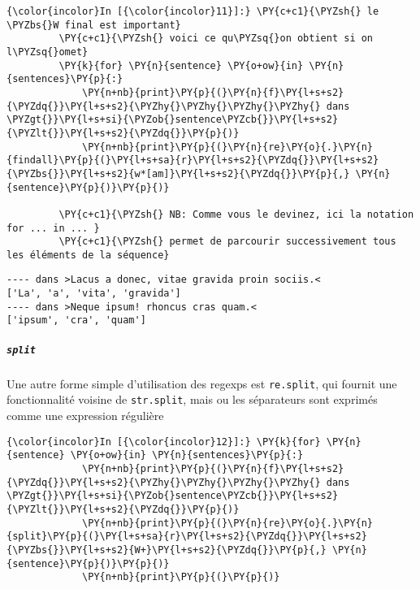     \begin{Verbatim}[commandchars=\\\{\},frame=single,framerule=0.3mm,rulecolor=\color{cellframecolor}]
{\color{incolor}In [{\color{incolor}11}]:} \PY{c+c1}{\PYZsh{} le \PYZbs{}W final est important}
         \PY{c+c1}{\PYZsh{} voici ce qu\PYZsq{}on obtient si on l\PYZsq{}omet}
         \PY{k}{for} \PY{n}{sentence} \PY{o+ow}{in} \PY{n}{sentences}\PY{p}{:}
             \PY{n+nb}{print}\PY{p}{(}\PY{n}{f}\PY{l+s+s2}{\PYZdq{}}\PY{l+s+s2}{\PYZhy{}\PYZhy{}\PYZhy{}\PYZhy{} dans \PYZgt{}}\PY{l+s+si}{\PYZob{}sentence\PYZcb{}}\PY{l+s+s2}{\PYZlt{}}\PY{l+s+s2}{\PYZdq{}}\PY{p}{)}
             \PY{n+nb}{print}\PY{p}{(}\PY{n}{re}\PY{o}{.}\PY{n}{findall}\PY{p}{(}\PY{l+s+sa}{r}\PY{l+s+s2}{\PYZdq{}}\PY{l+s+s2}{\PYZbs{}}\PY{l+s+s2}{w*[am]}\PY{l+s+s2}{\PYZdq{}}\PY{p}{,} \PY{n}{sentence}\PY{p}{)}\PY{p}{)}
             
         \PY{c+c1}{\PYZsh{} NB: Comme vous le devinez, ici la notation for ... in ... }
         \PY{c+c1}{\PYZsh{} permet de parcourir successivement tous les éléments de la séquence}
\end{Verbatim}


    \begin{Verbatim}[commandchars=\\\{\},frame=single,framerule=0.3mm,rulecolor=\color{cellframecolor}]
---- dans >Lacus a donec, vitae gravida proin sociis.<
['La', 'a', 'vita', 'gravida']
---- dans >Neque ipsum! rhoncus cras quam.<
['ipsum', 'cra', 'quam']
\end{Verbatim}

    \hypertarget{split}{%
\subparagraph{\texorpdfstring{\texttt{split}}{split}}\label{split}}

    Une autre forme simple d'utilisation des regexps est \texttt{re.split},
qui fournit une fonctionnalité voisine de \texttt{str.split}, mais ou
les séparateurs sont exprimés comme une expression régulière

    \begin{Verbatim}[commandchars=\\\{\},frame=single,framerule=0.3mm,rulecolor=\color{cellframecolor}]
{\color{incolor}In [{\color{incolor}12}]:} \PY{k}{for} \PY{n}{sentence} \PY{o+ow}{in} \PY{n}{sentences}\PY{p}{:}
             \PY{n+nb}{print}\PY{p}{(}\PY{n}{f}\PY{l+s+s2}{\PYZdq{}}\PY{l+s+s2}{\PYZhy{}\PYZhy{}\PYZhy{}\PYZhy{} dans \PYZgt{}}\PY{l+s+si}{\PYZob{}sentence\PYZcb{}}\PY{l+s+s2}{\PYZlt{}}\PY{l+s+s2}{\PYZdq{}}\PY{p}{)}
             \PY{n+nb}{print}\PY{p}{(}\PY{n}{re}\PY{o}{.}\PY{n}{split}\PY{p}{(}\PY{l+s+sa}{r}\PY{l+s+s2}{\PYZdq{}}\PY{l+s+s2}{\PYZbs{}}\PY{l+s+s2}{W+}\PY{l+s+s2}{\PYZdq{}}\PY{p}{,} \PY{n}{sentence}\PY{p}{)}\PY{p}{)}
             \PY{n+nb}{print}\PY{p}{(}\PY{p}{)}
\end{Verbatim}


